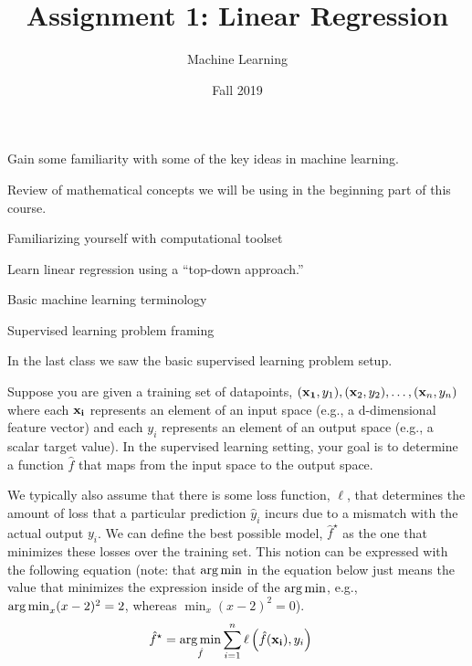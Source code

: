 \documentclass[assignment01_Solutions]{subfiles}
\title{Assignment 1: Linear Regression}
\author{Machine Learning}
\date{Fall 2019}
\begin{document}
\maketitle
\thispagestyle{firstpage}


\begin{learningobjectives}
\bi
\item Gain some familiarity with some of the key ideas in machine learning.
\item Review of mathematical concepts we will be using in the beginning part of this course.
\item Familiarizing yourself with computational toolset
\item Learn linear regression using a ``top-down approach.''
\ei
\end{learningobjectives}


\begin{priorknowledge}
\bi
\item Basic machine learning terminology
\item Supervised learning problem framing
\ei
\end{priorknowledge}


\begin{recall}
In the last class we saw the basic supervised learning problem setup.

Suppose you are given a training set of datapoints, $(\mathbf{x_1}, y_1), (\mathbf{x}_2, y_2), \ldots, (\mathbf{x}_n, y_n)$ where each $\mathbf{x_i}$ represents an element of an input space (e.g., a d-dimensional feature vector) and each $y_i$ represents an element of an output space (e.g., a scalar target value).  In the supervised learning setting, your goal is to determine a function $\hat{f}$ that maps from the input space to the output space.

We typically also assume that there is some loss function, $\ell$, that determines the amount of loss that a particular prediction $\hat{y}_i$ incurs due to a mismatch with the actual output $y_i$.  We can define the best possible model, $\hat{f}^\star$ as the one that minimizes these losses over the training set.  This notion can be expressed with the following equation  (note: that $\operatorname*{arg\,min}$ in the equation below just means the value that minimizes the expression inside of the $\operatorname*{arg\,min}$, e.g., $\operatorname*{arg\,min}_{x} (x - 2)^2 = 2$, whereas $\min_{x} (x-2)^2 = 0$).
\begin{align}
\hat{f}^\star &= \operatorname*{arg\,min}_{\hat{f}} \sum_{i=1}^n \ell \left ( \hat{f}(\mathbf{x_i}), y_i \right )
\end{align} 

\end{recall}
\end{document}
